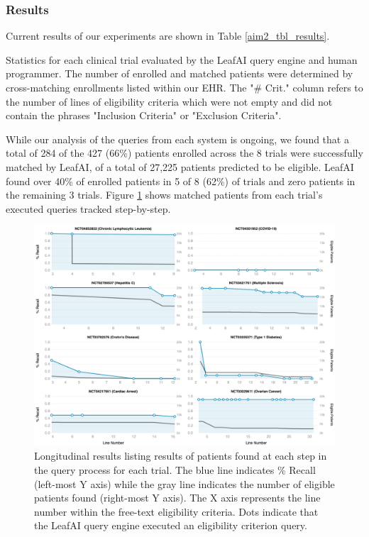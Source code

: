 \documentclass[../main.tex]{subfiles}
\begin{document}
\subsubsection{Results}

Current results of our experiments are shown in Table \ref{aim2_tbl_results}.

\begin{table}[h!]
    \footnotesize
    \centering
    
    \caption{Statistics for each clinical trial evaluated by the LeafAI query engine and human programmer. The number of enrolled and matched patients were determined by cross-matching enrollments listed within our EHR. The "\# Crit." column refers to the number of lines of eligibility criteria which were not empty and did not contain the phrases "Inclusion Criteria" or "Exclusion Criteria".}
    \label{aim2_tbl_results}
\end{table} 

While our analysis of the queries from each system is ongoing, we found that a total of 284 of the 427 (66\%) patients enrolled across the 8 trials were successfully matched by LeafAI, of a total of 27,225 patients predicted to be eligible. LeafAI found over 40\% of enrolled patients in 5 of 8 (62\%) of trials and zero patients in the remaining 3 trials. Figure \ref{aim2_fig_leafai_results_detail} shows matched patients from each trial's executed queries tracked step-by-step.

\begin{figure}[h!]
  \includegraphics[scale=0.47]{Figures/Aim2/aim2_leafai_detail_results_longitudinal.png}  
  \caption{Longitudinal results listing results of patients found at each step in the query process for each trial. The blue line indicates \% Recall (left-most Y axis) while the gray line indicates the number of eligible patients found (right-most Y axis). The X axis represents the line number within the free-text eligibility criteria. Dots indicate that the LeafAI query engine executed an eligibility criterion query.}
\label{aim2_fig_leafai_results_detail}
\end{figure}
\end{document}
